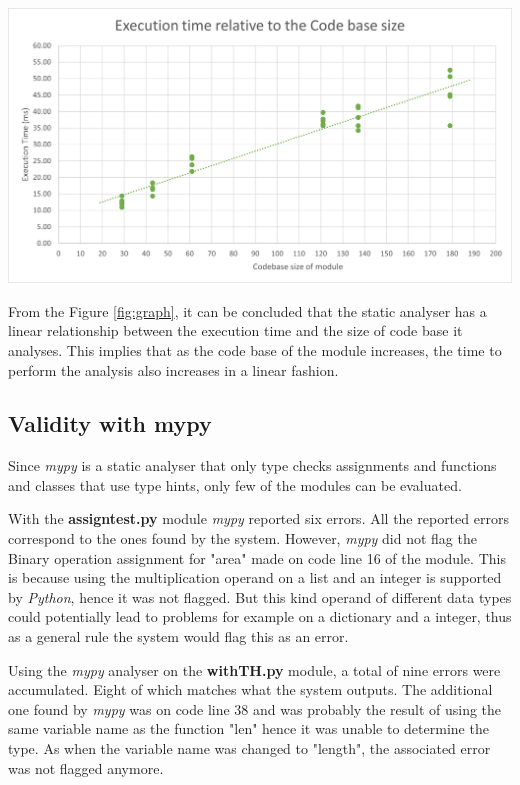 \documentclass{l4proj}
\begin{document}
\begin{center}
    \includegraphics[width=\textwidth]{images/Graph.png}
    \label{fig:graph}
\end{center}

From the Figure \ref{fig:graph}, it can be concluded that the static analyser has a linear relationship between the execution time and the size of code base it analyses. This implies that as the code base of the module increases, the time to perform the analysis also increases in a linear fashion.

\subsection{Validity with mypy}
Since \emph{mypy} is a static analyser that only type checks assignments and functions and classes that use type hints, only few of the modules can be evaluated. 

With the \textbf{assign\textunderscore test.py} module \textit{mypy} reported six errors. All the reported errors correspond to the ones found by the system. However, \textit{mypy} did not flag the Binary operation assignment for "area" made on code line 16 of the module. This is because using the multiplication operand on a list and an integer is supported by \emph{Python}, hence it was not flagged. But this kind operand of different data types could potentially lead to problems for example on a dictionary and a integer, thus as a general rule the system would flag this as an error.

Using the \textit{mypy} analyser on the \textbf{withTH.py} module, a total of nine errors were accumulated. Eight of which matches what the system outputs. The additional one found by \textit{mypy} was on code line 38 and was probably the result of using the same variable name as the function "len" hence it was unable to determine the type. As when the variable name was changed to "length", the associated error was not flagged anymore. 
\end{document}
